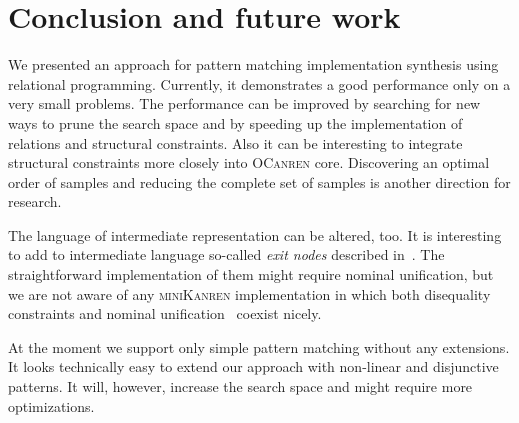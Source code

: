 \section{Conclusion and future work}

We presented an approach for pattern matching implementation synthesis using relational programming. Currently, it demonstrates a good performance only
on a very small problems. The performance can be improved by searching for new ways to prune the search space and by speeding up the implementation of
relations and structural constraints. Also it can be interesting to integrate structural constraints more closely into \textsc{OCanren} core.
Discovering an optimal order of samples and reducing the complete set of samples is another direction for research.

The language of intermediate representation can be altered, too. It is interesting to add to intermediate language so-called \emph{exit nodes}
described in~\cite{maranget2001}. The straightforward implementation of them might require nominal unification, but we are not aware of any
\textsc{miniKanren} implementation in which both disequality constraints and nominal unification~\cite{alphaKanren} coexist nicely.

At the moment we support only simple pattern matching without any extensions. It looks technically easy to extend our approach with
non-linear and disjunctive patterns. It will, however, increase the search space and might require more optimizations.



